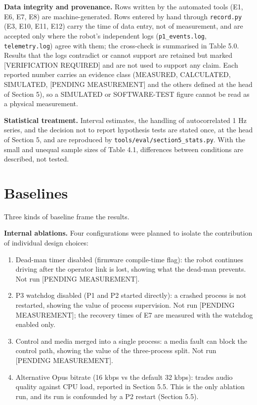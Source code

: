 \textbf{Data integrity and provenance.} Rows written by the automated tools (E1, E6, E7, E8) are machine-generated. Rows entered by hand through \texttt{record.py} (E3, E10, E11, E12) carry the time of data entry, not of measurement, and are accepted only where the robot's independent logs (\texttt{p1\_events.log}, \texttt{telemetry.log}) agree with them; the cross-check is summarised in Table 5.0. Results that the logs contradict or cannot support are retained but marked [VERIFICATION REQUIRED] and are not used to support any claim. Each reported number carries an evidence class (MEASURED, CALCULATED, SIMULATED, [PENDING MEASUREMENT] and the others defined at the head of Section 5), so a SIMULATED or SOFTWARE-TEST figure cannot be read as a physical measurement.

\textbf{Statistical treatment.} Interval estimates, the handling of autocorrelated 1 Hz series, and the decision not to report hypothesis tests are stated once, at the head of Section 5, and are reproduced by \texttt{tools/eval/section5\_stats.py}. With the small and unequal sample sizes of Table 4.1, differences between conditions are described, not tested.

\section{Baselines}

Three kinds of baseline frame the results.

\textbf{Internal ablations.} Four configurations were planned to isolate the contribution of individual design choices:

\begin{enumerate}
\item Dead-man timer disabled (firmware compile-time flag): the robot continues driving after the operator link is lost, showing what the dead-man prevents. Not run [PENDING MEASUREMENT].
\item P3 watchdog disabled (P1 and P2 started directly): a crashed process is not restarted, showing the value of process supervision. Not run [PENDING MEASUREMENT]; the recovery times of E7 are measured with the watchdog enabled only.
\item Control and media merged into a single process: a media fault can block the control path, showing the value of the three-process split. Not run [PENDING MEASUREMENT].
\item Alternative Opus bitrate (16 kbps vs the default 32 kbps): trades audio quality against CPU load, reported in Section 5.5. This is the only ablation run, and its run is confounded by a P2 restart (Section 5.5).
\end{enumerate}

